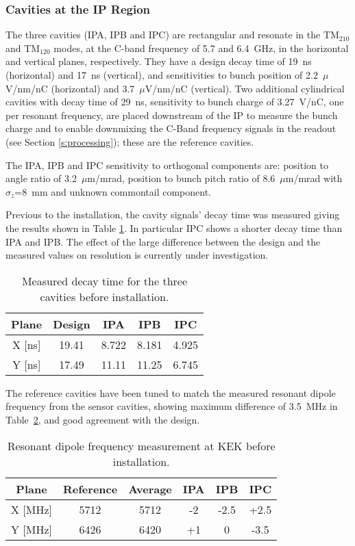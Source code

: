 \subsubsection{Cavities at the IP Region}\label{s:IPBPMsignals}
The three cavities (IPA, IPB and IPC) are rectangular and resonate in the TM$_{210}$ and TM$_{120}$ modes, at the C-band frequency of 5.7 and 6.4~GHz, in the horizontal and vertical planes, respectively. They have a design decay time of 19~ns (horizontal) and 17~ns (vertical), and sensitivities to bunch position of 2.2~$\mu$V/nm/nC (horizontal) and 3.7~$\mu$V/nm/nC (vertical). Two additional cylindrical cavities with decay time of 29~ns, sensitivity to bunch charge of 3.27~V/nC, one per resonant frequency, are placed downstream of the IP to measure the bunch charge and to enable downmixing the C-Band frequency signals in the readout (see Section \ref{s:processing}); these are the reference cavities.\par
The IPA, IPB and IPC sensitivity to orthogonal components are: position to angle ratio of 3.2~$\mu$m/mrad, position to bunch pitch ratio of 8.6~$\mu$m/mrad with $\sigma_z$=8~mm and unknown commontail component.\par
Previous to the installation, the cavity signals' decay time was measured giving the results shown in Table \ref{t:decayt}. In particular IPC shows a shorter decay time than IPA and IPB. The effect of the large difference between the design and the measured values on resolution is currently under investigation.\par
\begin{table}[h]
\centering
\begin{tabular}{c|c||c|c|c}\hline
 Plane & Design & IPA & IPB & IPC \\\hline\hline
  X [ns] & 19.41 & 8.722 & 8.181 & 4.925\\
  Y [ns] & 17.49 & 11.11 & 11.25 & 6.745\\\hline
\end{tabular}\caption{Measured decay time for the three cavities before installation.}\label{t:decayt}
\end{table}
The reference cavities have been tuned to match the measured resonant dipole frequency from the sensor cavities, showing maximum difference of 3.5~MHz in Table~\ref{t:dipolefreq}, and good agreement with the design. 
\begin{table}[h]
\centering
\begin{tabular}{c|c||c|c|c|c}\hline
 Plane & Reference & Average & IPA & IPB & IPC \\\hline\hline
  X [MHz] & 5712 & 5712 & -2 & -2.5 & +2.5\\
  Y [MHz] & 6426 & 6420 & +1 & 0 & -3.5\\\hline
\end{tabular}\caption{Resonant dipole frequency measurement at KEK before installation.}\label{t:dipolefreq}
\end{table}

